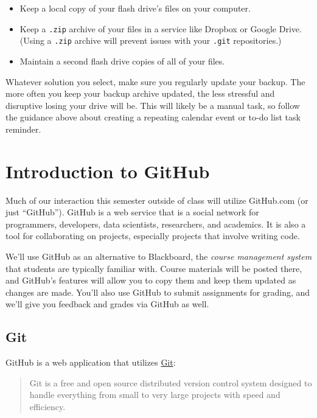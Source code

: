 \documentclass[]{book}
\providecommand{\tightlist}{%
  \setlength{\itemsep}{0pt}\setlength{\parskip}{0pt}}
\begin{document}
\begin{itemize}
\tightlist
\item
  Keep a local copy of your flash drive's files on your computer.
\item
  Keep a \texttt{.zip} archive of your files in a service like Dropbox
  or Google Drive. (Using a \texttt{.zip} archive will prevent issues
  with your \texttt{.git} repositories.)
\item
  Maintain a second flash drive copies of all of your files.
\end{itemize}

Whatever solution you select, make sure you regularly update your
backup. The more often you keep your backup archive updated, the less
stressful and disruptive losing your drive will be. This will likely be
a manual task, so follow the guidance above about creating a repeating
calendar event or to-do list task reminder.

\chapter{Introduction to GitHub}\label{introduction-to-github}

Much of our interaction this semester outside of class will utilize
GitHub.com (or just ``GitHub''). GitHub is a web service that is a
social network for programmers, developers, data scientists,
researchers, and academics. It is also a tool for collaborating on
projects, especially projects that involve writing code.

We'll use GitHub as an alternative to Blackboard, the \emph{course
management system} that students are typically familiar with. Course
materials will be posted there, and GitHub's features will allow you to
copy them and keep them updated as changes are made. You'll also use
GitHub to submit assignments for grading, and we'll give you feedback
and grades via GitHub as well.

\section{Git}\label{git}

GitHub is a web application that utilizes
\href{https://git-scm.com}{Git}:

\begin{quote}
Git is a free and open source distributed version control system
designed to handle everything from small to very large projects with
speed and efficiency.
\end{quote}
\end{document}
